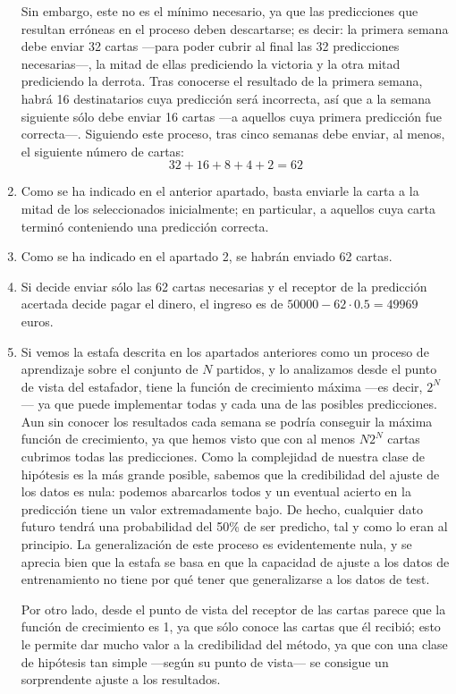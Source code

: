 \documentclass[a4paper, 11pt]{article}
\begin{document}
\begin{solucion}
\begin{solucion}
\begin{enumerate}
              Sin embargo, este no es el mínimo necesario, ya que las predicciones que resultan erróneas en el proceso deben descartarse; es decir: la primera semana debe enviar 32 cartas ---para poder cubrir al final las 32 predicciones necesarias---, la mitad de ellas prediciendo la victoria y la otra mitad prediciendo la derrota. Tras conocerse el resultado de la primera semana, habrá 16 destinatarios cuya predicción será incorrecta, así que a la semana siguiente sólo debe enviar 16 cartas ---a aquellos cuya primera predicción fue correcta---. Siguiendo este proceso, tras cinco semanas debe enviar, al menos, el siguiente número de cartas:
              \[
              32 + 16 + 8 + 4 + 2 = 62
              \]
              \item Como se ha indicado en el anterior apartado, basta enviarle la carta a la mitad de los seleccionados inicialmente; en particular, a aquellos cuya carta terminó conteniendo una predicción correcta.
              \item Como se ha indicado en el apartado 2, se habrán enviado 62 cartas.
              \item Si decide enviar sólo las 62 cartas necesarias y el receptor de la predicción acertada decide pagar el dinero, el ingreso es de $
              50000 - 62\cdot0.5 = 49969$ euros.
              \item Si vemos la estafa descrita en los apartados anteriores como un proceso de aprendizaje sobre el conjunto de $N$ partidos, y lo analizamos desde el punto de vista del estafador, tiene la función de crecimiento máxima ---es decir, $2^N$--- ya que puede implementar todas y cada una de las posibles predicciones. Aun sin conocer los resultados cada semana se podría conseguir la máxima función de crecimiento, ya que hemos visto que con al menos $N2^N$ cartas cubrimos todas las predicciones. Como la complejidad de nuestra clase de hipótesis es la más grande posible, sabemos que la credibilidad del ajuste de los datos es nula: podemos abarcarlos todos y un eventual acierto en la predicción tiene un valor extremadamente bajo. De hecho, cualquier dato futuro tendrá una probabilidad del 50\% de ser predicho, tal y como lo eran al principio. La generalización de este proceso es evidentemente nula, y se aprecia bien que la estafa se basa en que la capacidad de ajuste a los datos de entrenamiento no tiene por qué tener que generalizarse a los datos de test.

              Por otro lado, desde el punto de vista del receptor de las cartas parece que la función de crecimiento es 1, ya que sólo conoce las cartas que él recibió; esto le permite dar mucho valor a la credibilidad del método, ya que con una clase de hipótesis tan simple ---según su punto de vista--- se consigue un sorprendente ajuste a los resultados.
          \end{enumerate}
      \end{solucion}



\end{solucion}
\end{document}
